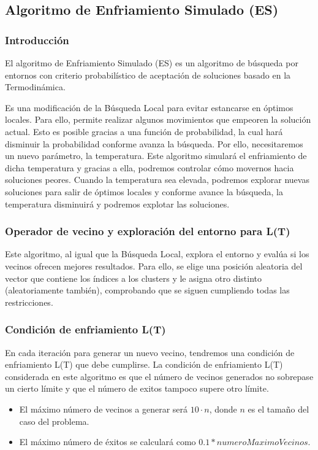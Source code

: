 	\subsection{Algoritmo de Enfriamiento Simulado (ES)}
	
	\subsubsection{Introducción}
	El algoritmo de Enfriamiento Simulado (ES) es un algoritmo de búsqueda por entornos con 
	criterio probabilístico de aceptación de soluciones basado en la Termodinámica.

	Es una modificación de la Búsqueda Local para evitar estancarse en óptimos locales. Para ello,
	permite realizar algunos movimientos que empeoren la solución actual. Esto es posible 
	gracias a una función de probabilidad, la cual hará disminuir la probabilidad conforme avanza 
	la búsqueda. Por ello, necesitaremos un nuevo parámetro, la temperatura. Este algoritmo simulará el enfriamiento
	de dicha temperatura y gracias a ella, podremos controlar cómo movernos hacia soluciones peores.
	Cuando la temperatura sea elevada, podremos explorar nuevas soluciones para salir de óptimos locales
	y conforme avance la búsqueda, la temperatura disminuirá y podremos explotar las soluciones.

	\subsubsection{Operador de vecino y exploración del entorno para L(T)}
	Este algoritmo, al igual que la Búsqueda Local, explora el entorno y evalúa si 
	los vecinos ofrecen mejores resultados. Para ello, se elige una posición aleatoria del vector que
	contiene los índices a los clusters y le asigna otro distinto (aleatoriamente también), comprobando que se siguen cumpliendo todas las 
	restricciones.

	\subsubsection{Condición de enfriamiento L(T)}
	En cada iteración para generar un nuevo vecino, tendremos una condición de enfriamiento L(T) que debe cumplirse.
	La condición de enfriamiento L(T) considerada en este algoritmo es que el número de vecinos generados no 
	sobrepase un cierto límite y que el número de exitos tampoco supere otro límite.
	
	\begin{itemize}
		\item El máximo número de vecinos a generar será $10\cdot n$, donde $n$ es el tamaño del caso del problema.
		\item El máximo número de éxitos se calculará como $0.1*numeroMaximoVecinos$.
	\end{itemize}


